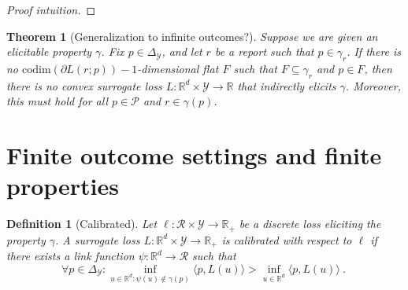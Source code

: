 \documentclass{article}
\newcommand{\Comments}{1}
\newcommand{\mynote}[2]{\ifnum\Comments=1\textcolor{#1}{#2}\fi}
\newcommand{\jessie}[1]{\mynote{purple}{[JF: #1]}}
\newcommand{\reals}{\mathbb{R}}
\newcommand{\simplex}{\Delta_\Y}
\newcommand{\codim}{\mathrm{codim}}
\newcommand{\R}{\mathcal{R}}
\newcommand{\Y}{\mathcal{Y}}
\newcommand{\inprod}[2]{\langle #1, #2 \rangle}
\newtheorem{theorem}{Theorem}
\newtheorem{definition}{Definition}
\begin{document}
\begin{proof}[Proof intuition]
%	 
\end{proof}

\begin{theorem}[Generalization to infinite outcomes?]
	Suppose we are given an elicitable property $\gamma$.
	Fix $p \in \simplex$, and let $r$ be a report such that $p \in \gamma_r$.  
	If there is no $\codim(\partial L(r;p))-1$-dimensional flat $F$ such that $F \subseteq \gamma_r$ and $p \in F$, then there is no convex surrogate loss $L : \reals^d \times \Y \to \reals$ that indirectly elicits $\gamma$.
	Moreover, this must hold for all $p \in \mathcal{P}$ and $r \in \gamma(p)$.
\end{theorem}


\section{Finite outcome settings and finite properties}
\begin{definition}[Calibrated]
	Let $\ell : \R \times \Y \to \reals_+$ be a discrete loss eliciting the property $\gamma$.
	A surrogate loss $L : \reals^d \times \Y \to \reals_+$ is \emph{calibrated} with respect to $\ell$ if there exists a link function $\psi: \reals^d \to \R$ such that
	\begin{equation}
	\forall p \in \simplex: \inf_{u \in \reals^d : \psi(u) \not \in \gamma(p)} \inprod{p}{L(u)} > \inf_{u \in \reals^d} \inprod{p}{L(u)}~.~
	\end{equation}
\end{definition}
\end{document}

